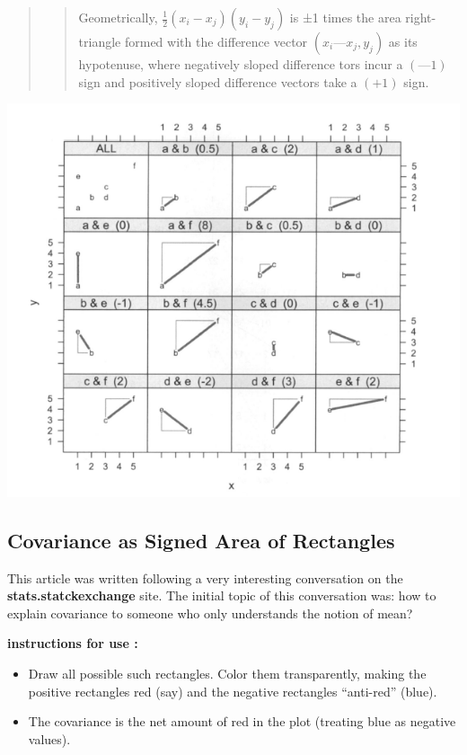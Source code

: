 \documentclass[
]{report}
\providecommand{\tightlist}{%
  \setlength{\itemsep}{0pt}\setlength{\parskip}{0pt}}
\begin{document}
\begin{quote}
\begin{quote}
Geometrically, \(\frac{1}{2}(x_i-x_j)(y_i - y_j)\) is ±1 times the area right-triangle formed with the difference vector \((x_i — x_j, y_j)\) as its hypotenuse, where negatively sloped difference tors incur a \((—1)\) sign and positively sloped difference vectors take a \((+1)\) sign. \citep{Hayes}
\end{quote}
\end{quote}

\includegraphics[width=8.65in]{hayes}

\hypertarget{covariance-as-signed-area-of-rectangles}{%
\subsection{Covariance as Signed Area of Rectangles}\label{covariance-as-signed-area-of-rectangles}}

This article \citep{chudzicki} was written following a very interesting conversation on the \textbf{stats.statckexchange} site. The initial topic of this conversation was: how to explain covariance to someone who only understands the notion of mean?

\textbf{instructions for use :}

\begin{itemize}
\tightlist
\item
  Draw all possible such rectangles. Color them transparently, making the positive rectangles red (say) and the negative rectangles ``anti-red'' (blue).
\item
  The covariance is the net amount of red in the plot (treating blue as negative values).
\end{itemize}
\end{document}
